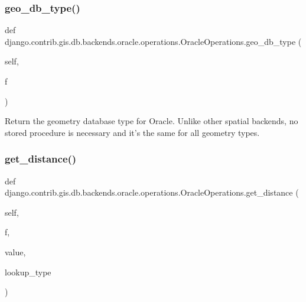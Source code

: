 \subsubsection{\texorpdfstring{geo\+\_\+db\+\_\+type()}{geo\_db\_type()}}
{\footnotesize\ttfamily def django.\+contrib.\+gis.\+db.\+backends.\+oracle.\+operations.\+Oracle\+Operations.\+geo\+\_\+db\+\_\+type (\begin{DoxyParamCaption}\item[{}]{self,  }\item[{}]{f }\end{DoxyParamCaption})}

\begin{DoxyVerb}Return the geometry database type for Oracle. Unlike other spatial
backends, no stored procedure is necessary and it's the same for all
geometry types.
\end{DoxyVerb}
 \mbox{\label{classdjango_1_1contrib_1_1gis_1_1db_1_1backends_1_1oracle_1_1operations_1_1_oracle_operations_aa58f85f0032230bac9745424f18fe797}} 
\subsubsection{\texorpdfstring{get\+\_\+distance()}{get\_distance()}}
{\footnotesize\ttfamily def django.\+contrib.\+gis.\+db.\+backends.\+oracle.\+operations.\+Oracle\+Operations.\+get\+\_\+distance (\begin{DoxyParamCaption}\item[{}]{self,  }\item[{}]{f,  }\item[{}]{value,  }\item[{}]{lookup\+\_\+type }\end{DoxyParamCaption})}

